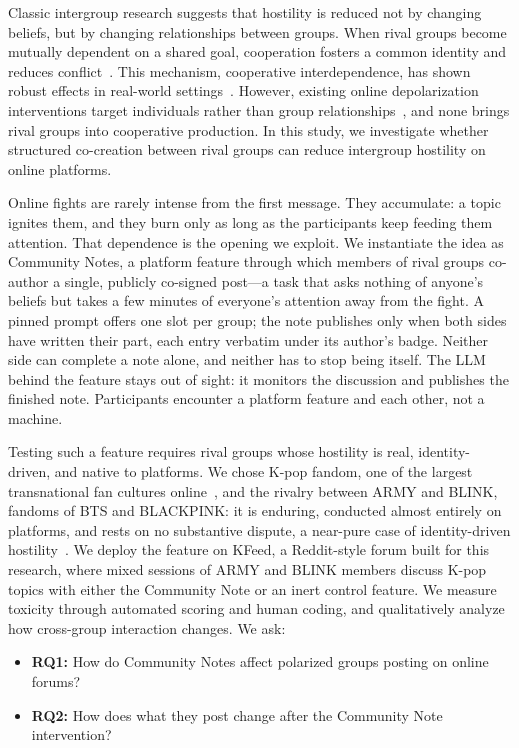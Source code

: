 \documentclass[manuscript,screen,review,anonymous]{acmart}
\begin{document}
Classic intergroup research suggests that hostility is reduced not by
changing beliefs, but by changing relationships between groups. When rival
groups become mutually dependent on a shared goal, cooperation fosters a
common identity and reduces conflict~\cite{sherif1954, gaertner2000}. This
mechanism, cooperative interdependence, has shown robust effects in
real-world settings~\cite{levine2005, mousa2020}. However, existing online
depolarization interventions target individuals rather than group
relationships~\cite{guess2023, combs2023, wojcik2022}, and none brings rival
groups into cooperative production. In this study, we investigate whether
structured co-creation between rival groups can reduce intergroup hostility
on online platforms.

Online fights are rarely intense from the first message. They accumulate: a
topic ignites them, and they burn only as long as the participants keep
feeding them attention. That dependence is the opening we exploit. We
instantiate the idea as Community Notes, a platform feature through which
members of rival groups co-author a single, publicly co-signed post---a task
that asks nothing of anyone's beliefs but takes a few minutes of everyone's
attention away from the fight. A pinned
prompt offers one slot per group; the note publishes only when both sides
have written their part, each entry verbatim under its author's badge.
Neither side can complete a note alone, and neither has to stop being itself.
The LLM behind the feature stays out of sight: it monitors the discussion and
publishes the finished note. Participants encounter a platform feature and
each other, not a machine.

Testing such a feature requires rival groups whose hostility is real,
identity-driven, and native to platforms. We chose K-pop fandom, one of the
largest transnational fan cultures online~\cite{jin2016, mclaren2020}, and
the rivalry between ARMY and BLINK, fandoms of BTS and BLACKPINK: it is
enduring, conducted almost entirely on platforms, and rests on no substantive
dispute, a near-pure case of identity-driven hostility~\cite{yin2020,
duffett2013}. We deploy the feature on KFeed, a Reddit-style forum built for
this research, where mixed sessions of ARMY and BLINK members discuss K-pop
topics with either the Community Note or an inert control feature. We
measure toxicity through automated scoring and human coding, and
qualitatively analyze how cross-group interaction changes. We ask:

\begin{itemize}
  \item \textbf{RQ1:} How do Community Notes affect polarized groups posting
  on online forums?
  \item \textbf{RQ2:} How does what they post change after the Community Note
  intervention?
\end{itemize}
\end{document}
